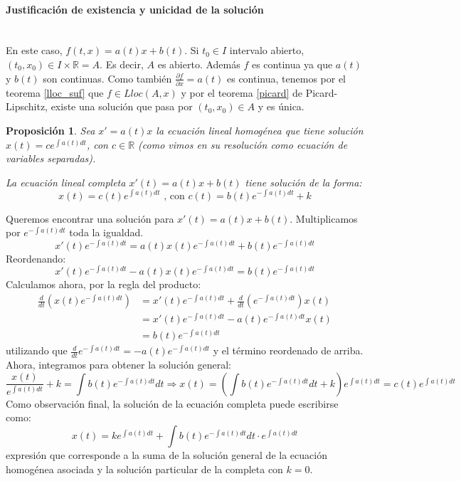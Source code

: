 \documentclass{article}
\makeatletter
\theoremstyle{theorem-style}  %
\newtheorem{proposition}[theorem]{Proposición}
\theoremstyle{definition-style}
\theoremstyle{example-style}
\renewenvironment{proof}[1][\proofname]{\par
	\pushQED{\qed}%
	\normalfont \topsep6\p@\@plus6\p@\relax
	\list{}{%
		\settowidth{\leftmargin}{\quad:\hskip\labelsep}%
		\setlength{\labelwidth}{0pt}%
		\setlength{\itemindent}{-\leftmargin}%
	}%
	\item[\hskip\labelsep\itshape#1\@addpunct{:}]\ignorespaces
}{%
	\popQED\endlist\@endpefalse
}
\makeatother
\begin{document}
\paragraph{Justificación de existencia y unicidad de la solución}\ \\
En este caso, $ f(t,x)=a(t)x+b(t) $. Si $ t_0\in I $ intervalo abierto, $ (t_0, x_0)\in I\times \mathbb{R}=A $. Es decir, $ A $ es abierto. Además $ f $ es continua ya que $ a(t) $ y $ b(t) $ son continuas. Como también $ \frac{\partial f}{\partial x}=a(t) $ es continua, tenemos por el teorema \ref{lloc_suf} que $ f\in L{loc}(A,x) $ y por el teorema \ref{picard} de Picard-Lipschitz, existe una solución que pasa por $ (t_0, x_0)\in A$ y es única.

\begin{proposition}\label{ecLinCompleta}
	Sea $ x'=a(t)x $ la ecuación lineal homogénea que tiene solución $ x(t)=c e^{\int a(t) dt} $, con $ c\in \mathbb{R} $ (como vimos en su resolución como ecuación de variables separadas). 
	
	La ecuación lineal completa $ x'(t)=a(t)x+b(t) $ tiene solución de la forma: \[ x(t)= c(t)e^{\int a(t) dt}\text{ , con } c(t)= b(t)e^{-\int a(t) dt}+k\]
\end{proposition}
\begin{proof}
	Queremos encontrar una solución para $ x'(t)=a(t)x+b(t) $. Multiplicamos por $ e^{-\int a(t)dt} $  toda la igualdad.
	\[ x'(t)e^{-\int a(t)dt}=a(t)x(t)e^{-\int a(t)dt}+b(t)e^{-\int a(t)dt}\]
	Reordenando:
	\[  x'(t)e^{-\int a(t)dt}-a(t)x(t)e^{-\int a(t)dt}=b(t)e^{-\int a(t)dt} \]
	Calculamos ahora, por la regla del producto:	
	\[ \begin{split}
	\frac{d}{dt}(x(t)e^{-\int a(t)dt})&=x'(t)e^{-\int a(t)dt}+\frac{d}{dt}(e^{-\int a(t)dt})x(t)\\
	&=x'(t)e^{-\int a(t)dt}-a(t)e^{-\int a(t)dt}x(t)\\
	&=b(t)e^{-\int a(t)dt}
	\end{split} \]
	utilizando que $ \frac{d}{dt}e^{-\int a(t)dt}=-a(t)e^{-\int a(t)dt} $ y el término reordenado de arriba.
	Ahora, integramos para obtener la solución general:
	\[ \frac{x(t)}{e^{\int a(t)dt}}+k= \int b(t)e^{-\int a(t)dt} dt\Rightarrow x(t)= (\int b(t)e^{-\int a(t)dt} dt+k)e^{\int a(t)dt}=c(t)e^{\int a(t)dt} \]
	Como observación final, la solución de la ecuación completa puede escribirse como:
	\[ x(t)= ke^{\int a(t)dt}+\int b(t)e^{-\int a(t)dt} dt\cdot e^{\int a(t)dt} \]
	 expresión que corresponde a la suma de la solución general de la ecuación homogénea asociada y la solución particular de la completa con $ k=0 $.
\end{proof}
\end{document}
